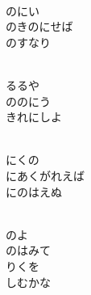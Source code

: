 \documentclass[10pt,b5j]{tarticle} %
\begin{document}
\vspace{1.5em} %
\newcommand{\linespace}{0.5em} %
\newcommand{\blocksize}{0.5\hsize} %
\newcommand{\itemmargin}{3em} %
\begin{enumerate} %
    \setlength{\itemindent}{\itemmargin} %
    \begin{minipage}[c]{\blocksize}
    
        \vspace{\linespace}
        \item~\\
        のにい\\
        のきのにせば\\
        のすなり
        
    \end{minipage}
    \begin{minipage}[c]{\blocksize}
        
        \vspace{\linespace}
        \item~\\
        るるや\\
        ののにう\\
        きれにしよ
        
    \end{minipage}
    \begin{minipage}[c]{\blocksize}
        
        \vspace{\linespace}
        \item~\\
        にくの\\
        にあくがれえば\\
        にのはえぬ
        
    \end{minipage}
    \begin{minipage}[c]{\blocksize}
        
        \vspace{\linespace}
        \item~\\
        のよ\\
        のはみて\\
        りくを\\
        しむかな
        

\end{minipage}
\end{enumerate}
\end{document}
